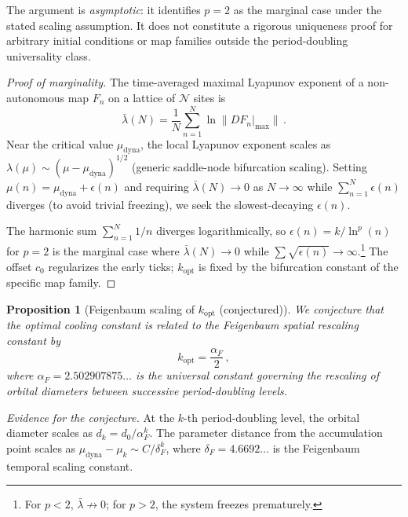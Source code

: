 \documentclass[twocolumn,showpacs,preprintnumbers,amsmath,amssymb,prd]{revtex4-2}
\newtheorem{proposition}{Proposition}
\begin{document}
The argument is \emph{asymptotic}: it identifies $p=2$ as the
marginal case under the stated scaling assumption.
It does not constitute a rigorous uniqueness proof for arbitrary
initial conditions or map families outside the period-doubling
universality class.

\begin{proof}[Proof of marginality]
The time-averaged maximal Lyapunov exponent of a non-autonomous
map $F_n$ on a lattice of $\mathcal{N}$ sites is
\begin{equation}
  \bar\lambda(N) = \frac{1}{N}\sum_{n=1}^{N}
    \ln\|DF_n|_{\max}\|\,.
  \label{eq:lyap}
\end{equation}
Near the critical value $\mu_{\mathrm{dyna}}$, the local
Lyapunov exponent scales as
$\lambda(\mu) \sim (\mu - \mu_{\mathrm{dyna}})^{1/2}$
(generic saddle-node bifurcation scaling).
Setting $\mu(n) = \mu_{\mathrm{dyna}} + \epsilon(n)$ and
requiring $\bar\lambda(N) \to 0$ as $N\to\infty$ while
$\sum_{n=1}^N \epsilon(n)$ diverges (to avoid trivial freezing),
we seek the slowest-decaying $\epsilon(n)$.

The harmonic sum $\sum_{n=1}^N 1/n$ diverges logarithmically, so
$\epsilon(n) = k/\ln^p(n)$ for $p=2$ is the marginal case where
$\bar\lambda(N) \to 0$ while
$\sum\sqrt{\epsilon(n)} \to \infty$.\footnote{For $p<2$,
$\bar\lambda \not\to 0$; for $p>2$, the system freezes
prematurely.}
The offset $c_0$ regularizes the early ticks; $k_{\mathrm{opt}}$
is fixed by the bifurcation constant of the specific map family.
\end{proof}

\begin{proposition}[Feigenbaum scaling of $k_{\mathrm{opt}}$
(conjectured)]\label{prop:kopt}
We conjecture that the optimal cooling constant is related to
the Feigenbaum spatial rescaling constant by
\begin{equation}
  k_{\mathrm{opt}} = \frac{\alpha_F}{2}\,,
  \label{eq:kopt_alphaF}
\end{equation}
where $\alpha_F = 2.502907875\ldots$ is the universal constant
governing the rescaling of orbital diameters between successive
period-doubling levels.
\end{proposition}

\emph{Evidence for the conjecture.}
At the $k$-th period-doubling level, the orbital diameter scales as
$d_k = d_0/\alpha_F^k$.
The parameter distance from the accumulation point scales as
$\mu_{\mathrm{dyna}} - \mu_k \sim C/\delta_F^k$, where
$\delta_F = 4.6692\ldots$ is the Feigenbaum temporal scaling constant.
\end{document}
